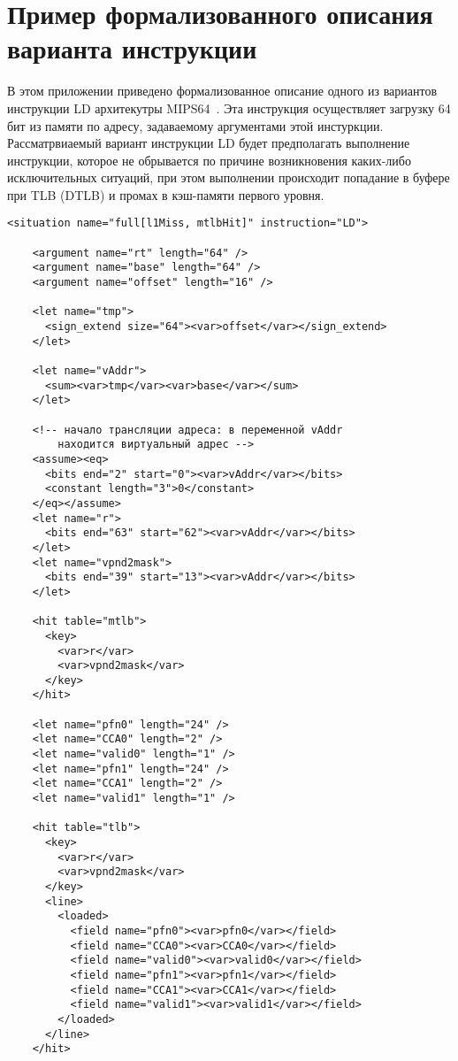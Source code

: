\chapter{Пример формализованного описания варианта инструкции}\label{sec:xml}

В этом приложении приведено формализованное описание одного из вариантов инструкции LD архитекутры MIPS64~\cite{mips64II}. Эта инструкция осуществляет загрузку 64 бит из памяти по адресу, задаваемому аргументами этой инстуркции. Рассматрвиаемый вариант инструкции LD будет предполагать выполнение инструкции, которое не обрывается по причине возникновения каких-либо исключительных ситуаций, при этом выполнении происходит попадание в буфере при TLB (DTLB) и промах в кэш-памяти первого уровня.

\begin{verbatim}
<situation name="full[l1Miss, mtlbHit]" instruction="LD">

    <argument name="rt" length="64" />
    <argument name="base" length="64" />
    <argument name="offset" length="16" />

    <let name="tmp">
      <sign_extend size="64"><var>offset</var></sign_extend>
    </let>

    <let name="vAddr">
      <sum><var>tmp</var><var>base</var></sum>
    </let>

    <!-- начало трансляции адреса: в переменной vAddr
        находится виртуальный адрес -->
    <assume><eq>
      <bits end="2" start="0"><var>vAddr</var></bits>
      <constant length="3">0</constant>
    </eq></assume>
    <let name="r">
      <bits end="63" start="62"><var>vAddr</var></bits>
    </let>
    <let name="vpnd2mask">
      <bits end="39" start="13"><var>vAddr</var></bits>
    </let>

    <hit table="mtlb">
      <key>
        <var>r</var>
        <var>vpnd2mask</var>
      </key>
    </hit>

    <let name="pfn0" length="24" />
    <let name="CCA0" length="2" />
    <let name="valid0" length="1" />
    <let name="pfn1" length="24" />
    <let name="CCA1" length="2" />
    <let name="valid1" length="1" />

    <hit table="tlb">
      <key>
        <var>r</var>
        <var>vpnd2mask</var>
      </key>
      <line>
        <loaded>
          <field name="pfn0"><var>pfn0</var></field>
          <field name="CCA0"><var>CCA0</var></field>
          <field name="valid0"><var>valid0</var></field>
          <field name="pfn1"><var>pfn1</var></field>
          <field name="CCA1"><var>CCA1</var></field>
          <field name="valid1"><var>valid1</var></field>
        </loaded>
      </line>
    </hit>


\end{verbatim}
